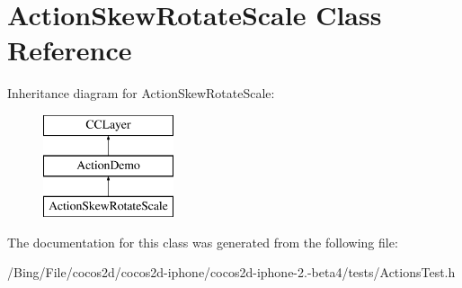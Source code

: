 \hypertarget{interface_action_skew_rotate_scale}{\section{Action\-Skew\-Rotate\-Scale Class Reference}
\label{interface_action_skew_rotate_scale}
}
Inheritance diagram for Action\-Skew\-Rotate\-Scale\-:\begin{figure}[H]
\begin{center}
\leavevmode
\includegraphics[height=3.000000cm]{interface_action_skew_rotate_scale}
\end{center}
\end{figure}


The documentation for this class was generated from the following file\-:\begin{DoxyCompactItemize}
\item 
/\-Bing/\-File/cocos2d/cocos2d-\/iphone/cocos2d-\/iphone-\/2.-\/beta4/tests/Actions\-Test.\-h\end{DoxyCompactItemize}
